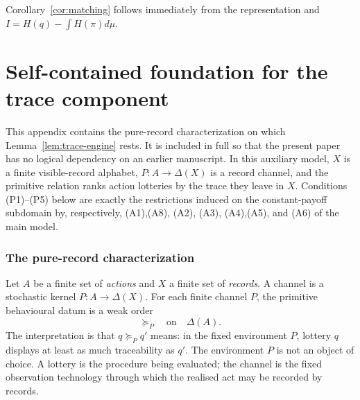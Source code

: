 \documentclass[11pt,a4paper]{article}
\theoremstyle{definition}
\newcommand{\I}{I}
\newcommand{\Sh}{H}
\newcommand{\1}{\mathbf 1}
\begin{document}
Corollary~\ref{cor:matching} follows immediately from the representation and
$\I=\Sh(q)-\int\Sh(\pi)d\mu$.

\clearpage

\part*{Self-contained foundation for the trace component}

This appendix contains the pure-record characterization on which
Lemma~\ref{lem:trace-engine} rests.  It is included in full so that the present
paper has no logical dependency on an earlier manuscript.  In this auxiliary
model, $X$ is a finite visible-record alphabet, $P:A\to\Delta(X)$ is a record
channel, and the primitive relation ranks action lotteries by the trace they
leave in $X$.  Conditions \textup{(P1)--(P5)} below are exactly the restrictions
induced on the constant-payoff subdomain by, respectively,
\textup{(A1),(A8)}, \textup{(A2)}, \textup{(A3)}, \textup{(A4),(A5)}, and
\textup{(A6)} of the main model.

\section{The pure-record characterization}\label{pt:sec:environment}

Let $A$ be a finite set of \emph{actions} and $X$ a finite set of \emph{records}.  A channel is a stochastic kernel
$P:A\to\Delta(X)$.  For each finite channel $P$, the primitive behavioural datum is a weak order
\[
\succeq_P\quad\text{on}\quad \Delta(A).
\]
The interpretation is that $q\succeq_P q'$ means: in the fixed environment $P$, lottery $q$ displays at least as much
traceability as $q'$.
The environment $P$ is not an object of choice.  A lottery is the procedure being evaluated; the channel is the fixed
observation technology through which the realised act may be recorded by records.
\end{document}
